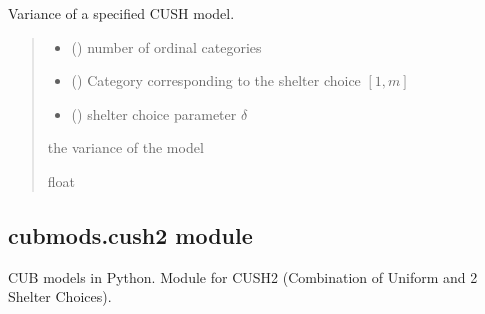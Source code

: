 \documentclass[letterpaper,10pt,english]{sphinxmanual}
\begin{document}
\begin{fulllineitems}
\label{\detokenize{cubmods:cubmods.cush.var}}
\pysigstartsignatures
{}
\pysigstopsignatures
\sphinxAtStartPar
Variance of a specified CUSH model.
\begin{quote}\begin{description}
\begin{itemize}
\item {} 
\sphinxAtStartPar
{} () \textendash{} number of ordinal categories

\item {} 
\sphinxAtStartPar
{} () \textendash{} Category corresponding to the shelter choice \([1,m]\)

\item {} 
\sphinxAtStartPar
{} () \textendash{} shelter choice parameter \(\delta\)

\end{itemize}

\sphinxAtStartPar
the variance of the model

\sphinxAtStartPar
float

\end{description}\end{quote}

\end{fulllineitems}



\subsection{cubmods.cush2 module}
\label{\detokenize{cubmods:module-cubmods.cush2}}\label{\detokenize{cubmods:cubmods-cush2-module}}\label{\detokenize{cubmods:cush200-module}}
\sphinxAtStartPar
CUB models in Python.
Module for CUSH2 (Combination of Uniform
and 2 Shelter Choices).
\end{document}

